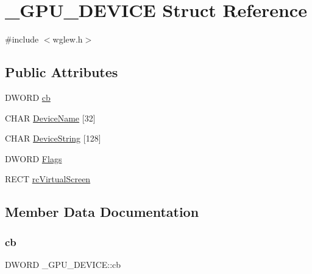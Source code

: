 \hypertarget{struct___g_p_u___d_e_v_i_c_e}{}\section{\+\_\+\+G\+P\+U\+\_\+\+D\+E\+V\+I\+CE Struct Reference}
\label{struct___g_p_u___d_e_v_i_c_e}


{\ttfamily \#include $<$wglew.\+h$>$}

\subsection*{Public Attributes}
\begin{DoxyCompactItemize}
\item 
D\+W\+O\+RD \mbox{\hyperlink{struct___g_p_u___d_e_v_i_c_e_afcb22f16ba9e526610489ff56ab78ddb}{cb}}
\item 
C\+H\+AR \mbox{\hyperlink{struct___g_p_u___d_e_v_i_c_e_a604bfab61f1a2c5d1e635837d369ba14}{Device\+Name}} \mbox{[}32\mbox{]}
\item 
C\+H\+AR \mbox{\hyperlink{struct___g_p_u___d_e_v_i_c_e_aff8b7920ccc85afcd6f325da6cdb0b73}{Device\+String}} \mbox{[}128\mbox{]}
\item 
D\+W\+O\+RD \mbox{\hyperlink{struct___g_p_u___d_e_v_i_c_e_a008db9d0f5fc13a5160805f40465f14a}{Flags}}
\item 
R\+E\+CT \mbox{\hyperlink{struct___g_p_u___d_e_v_i_c_e_aeb573bbeb3b6c589246720ef259b9a27}{rc\+Virtual\+Screen}}
\end{DoxyCompactItemize}


\subsection{Member Data Documentation}
\mbox{\label{struct___g_p_u___d_e_v_i_c_e_afcb22f16ba9e526610489ff56ab78ddb}} 
\subsubsection{\texorpdfstring{cb}{cb}}
{\footnotesize\ttfamily D\+W\+O\+RD \+\_\+\+G\+P\+U\+\_\+\+D\+E\+V\+I\+C\+E\+::cb}

\mbox{\label{struct___g_p_u___d_e_v_i_c_e_a604bfab61f1a2c5d1e635837d369ba14}} 
